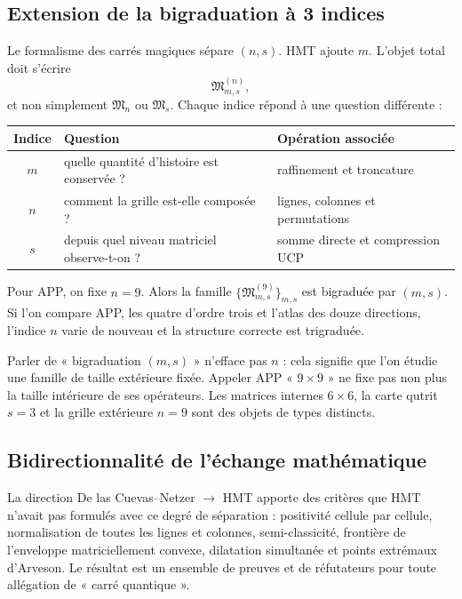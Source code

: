 \subsection{Extension de la bigraduation à 3 indices}

Le formalisme des carrés magiques sépare $(n,s)$. HMT ajoute $m$.
L'objet total doit s'écrire
\[
 \mathfrak M^{(n)}_{m,s},
 \tag{GMC-1.5}
\]
et non simplement \(\mathfrak M_n\) ou \(\mathfrak M_s\). Chaque indice répond
à une question différente :

\begin{center}
\begin{tabularx}{.92\textwidth}{@{}c L{.25\textwidth}Y@{}}
\toprule
Indice & Question & Opération associée\\
\midrule
$m$ & quelle quantité d'histoire est conservée ? & raffinement et troncature\\
$n$ & comment la grille est-elle composée ? & lignes, colonnes et permutations\\
$s$ & depuis quel niveau matriciel observe-t-on ? & somme directe et compression UCP\\
\bottomrule
\end{tabularx}
\end{center}

Pour APP, on fixe $n=9$. Alors la famille
$\{\mathfrak M^{(9)}_{m,s}\}_{m,s}$ est bigraduée par $(m,s)$. Si l'on
compare APP, les quatre \QLS d'ordre trois et l'atlas des douze directions,
l'indice $n$ varie de nouveau et la structure correcte est trigraduée.

\begin{controlbox}
Parler de « bigraduation $(m,s)$ » n'efface pas $n$ : cela signifie que l'on étudie une
famille de taille extérieure fixée. Appeler APP « $9\times9$ » ne fixe pas non plus
la taille intérieure de ses opérateurs. Les matrices internes $6\times6$, la
carte qutrit $s=3$ et la grille extérieure $n=9$ sont des objets de types
distincts.
\end{controlbox}

\subsection{Bidirectionnalité de l'échange mathématique}

La direction De las Cuevas--Netzer $\longrightarrow$ HMT apporte des critères que HMT n'avait pas
formulés avec ce degré de séparation : positivité cellule par cellule,
normalisation de toutes les lignes et colonnes, semi-classicité, frontière de
l'enveloppe matriciellement convexe, dilatation simultanée et points extrémaux d'Arveson. Le
résultat est un ensemble de preuves et de réfutateurs pour toute allégation de
« carré quantique ».

